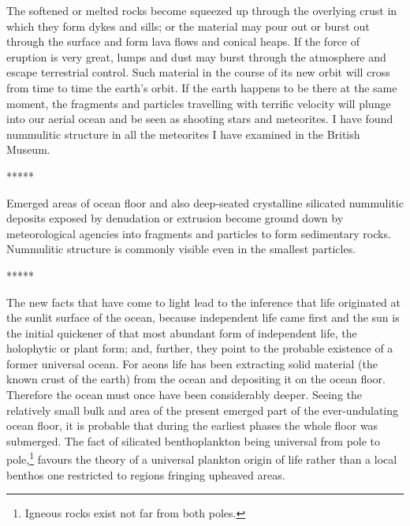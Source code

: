 \documentclass[a4paper, 12pt, oneside, landscape]{article}
\begin{document}
The softened or melted rocks become squeezed up through the overlying crust in which they form dykes and sills; or the material may pour out or burst out through the surface and form lava flows and conical heaps. If the force of eruption is very great, lumps and dust may burst through the atmosphere and escape terrestrial control. Such material in the course of its new orbit will cross from time to time the earth's orbit. If the earth happens to be there at the same moment, the fragments and particles travelling with terrific velocity will plunge into our aerial ocean and be seen as shooting stars and meteorites. I have found nummulitic structure in all the meteorites I have examined in the British Museum.

\centerline{*\hspace{15mm}*\hspace{15mm}*\hspace{15mm}*\hspace{15mm}*}
\bigskip

Emerged areas of ocean floor and also deep-seated crystalline silicated nummulitic deposits exposed by denudation or extrusion become ground down by meteorological agencies into fragments and particles to form sedimentary rocks. Nummulitic structure is commonly visible even in the smallest particles.

\centerline{*\hspace{15mm}*\hspace{15mm}*\hspace{15mm}*\hspace{15mm}*}
\bigskip

The new facts that have come to light lead to the inference that life originated at the sunlit surface of the ocean, because independent life came first and the sun is the initial quickener of that most abundant form of independent life, the holophytic or plant form; and, further, they point to the probable existence of a former universal ocean. For aeons life has been extracting solid material (the known crust of the earth) from the ocean and depositing it on the ocean floor. Therefore the ocean must once have been considerably deeper. Seeing the relatively small bulk and area of the present emerged part of the ever-undulating ocean floor, it is probable that during the earliest phases the whole floor was submerged. The fact of silicated benthoplankton being universal from pole to pole,\footnote{Igneous rocks exist not far from both poles.} favours the theory of a universal plankton origin of life rather than a local benthos one restricted to regions fringing upheaved areas.
\end{document}
